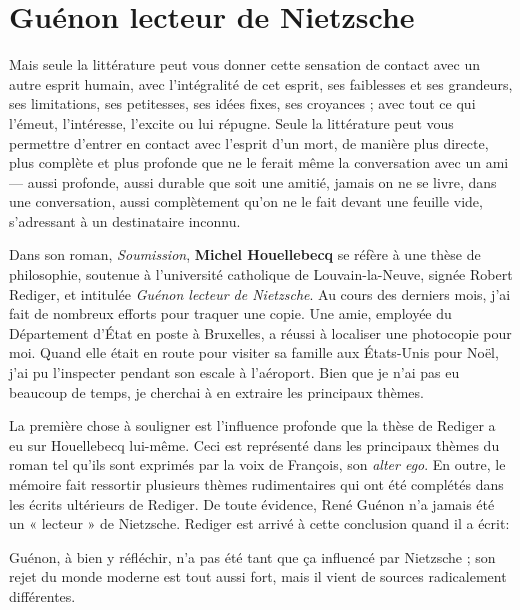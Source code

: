 \section{Guénon lecteur de Nietzsche}

\begin{quotex}
Mais seule la littérature peut vous donner cette sensation de contact avec un autre esprit humain, avec l'intégralité de cet esprit, ses faiblesses et ses grandeurs, ses limitations, ses petitesses, ses idées fixes, ses croyances ; avec tout ce qui l'émeut, l'intéresse, l'excite ou lui répugne. Seule la littérature peut vous permettre d'entrer en contact avec l'esprit d'un mort, de manière plus directe, plus complète et plus profonde que ne le ferait même la conversation avec un ami --- aussi profonde, aussi durable que soit une amitié, jamais on ne se livre, dans une conversation, aussi complètement qu'on ne le fait devant une feuille vide, s'adressant à un destinataire inconnu.
\end{quotex}


Dans son roman, \emph{Soumission}, \textbf{Michel Houellebecq} se réfère à une thèse de philosophie, soutenue à l'université catholique de Louvain-la-Neuve, signée Robert Rediger, et intitulée \emph{Guénon lecteur de Nietzsche}. Au cours des derniers mois, j'ai fait de nombreux efforts pour traquer une copie. Une amie, employée du Département d'État en poste à Bruxelles, a réussi à localiser une photocopie pour moi. Quand elle était en route pour visiter sa famille aux États-Unis pour Noël, j'ai pu l'inspecter pendant son escale à l'aéroport. Bien que je n'ai pas eu beaucoup de temps, je cherchai à en extraire les principaux thèmes.

La première chose à souligner est l'influence profonde que la thèse de Rediger a eu sur Houellebecq lui-même. Ceci est représenté dans les principaux thèmes du roman tel qu'ils sont exprimés par la voix de François, son \emph{alter ego}. En outre, le mémoire fait ressortir plusieurs thèmes rudimentaires qui ont été complétés dans les écrits ultérieurs de Rediger. De toute évidence, René Guénon n'a jamais été un «  lecteur » de Nietzsche. Rediger est arrivé à cette conclusion quand il a écrit:

\begin{quotex}
Guénon, à bien y réfléchir, n'a pas été tant que ça influencé par Nietzsche ; son rejet du monde moderne est tout aussi fort, mais il vient de sources radicalement différentes.
\end{quotex}



